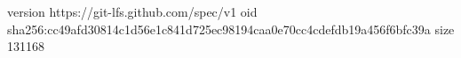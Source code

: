 version https://git-lfs.github.com/spec/v1
oid sha256:cc49afd30814c1d56e1c841d725ec98194caa0e70cc4cdefdb19a456f6bfc39a
size 131168
